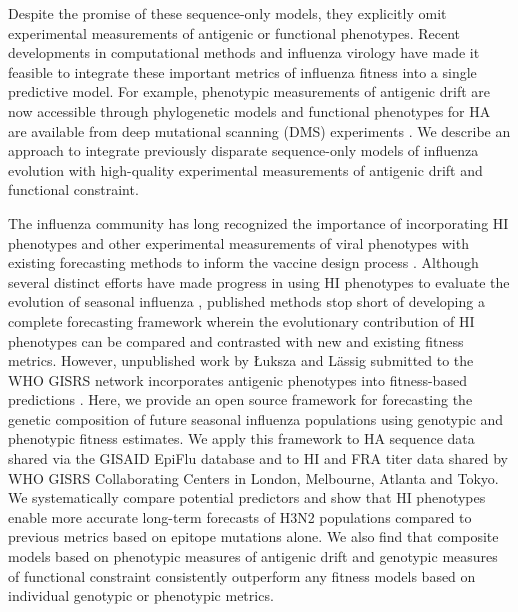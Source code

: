 \documentclass[9pt,lineno]{elife} %
\providecommand{\DIFaddbegin}{} %
\providecommand{\DIFaddend}{} %
\providecommand{\DIFdelbegin}{} %
\providecommand{\DIFdelend}{} %
\providecommand{\DIFaddbegin}{} %
\providecommand{\DIFaddend}{} %
\providecommand{\DIFdelbegin}{} %
\providecommand{\DIFdelend}{} %
\newcommand{\DIFscaledelfig}{0.5}
\newlength{\DIFdelgraphicswidth} %
\newlength{\DIFdelgraphicsheight} %
\newcommand{\DIFaddincludegraphics}[2][]{{\color{blue}\fbox{\DIFOincludegraphics[#1]{#2}}}} %
\newcommand{\DIFdelincludegraphics}[2][]{%
\sbox{\DIFdelgraphicsbox}{\DIFOincludegraphics[#1]{#2}}%
\settoboxwidth{\DIFdelgraphicswidth}{\DIFdelgraphicsbox} %
\settoboxtotalheight{\DIFdelgraphicsheight}{\DIFdelgraphicsbox} %
\scalebox{\DIFscaledelfig}{%
\parbox[b]{\DIFdelgraphicswidth}{\usebox{\DIFdelgraphicsbox}\\[-\baselineskip] \rule{\DIFdelgraphicswidth}{0em}}\llap{\resizebox{\DIFdelgraphicswidth}{\DIFdelgraphicsheight}{%
\setlength{\unitlength}{\DIFdelgraphicswidth}%
\begin{picture}(1,1)%
\thicklines\linethickness{2pt} %
{\color[rgb]{1,0,0}\put(0,0){\framebox(1,1){}}}%
{\color[rgb]{1,0,0}\put(0,0){\line( 1,1){1}}}%
{\color[rgb]{1,0,0}\put(0,1){\line(1,-1){1}}}%
\end{picture}%
}\hspace*{3pt}}} %
} %
\DeclareRobustCommand{\DIFaddbegin}{\DIFOaddbegin \let\includegraphics\DIFaddincludegraphics} %
\DeclareRobustCommand{\DIFaddend}{\DIFOaddend \let\includegraphics\DIFOincludegraphics} %
\DeclareRobustCommand{\DIFdelbegin}{\DIFOdelbegin \let\includegraphics\DIFdelincludegraphics} %
\DeclareRobustCommand{\DIFdelend}{\DIFOaddend \let\includegraphics\DIFOincludegraphics} %
\begin{document}
Despite the promise of these sequence-only models, they explicitly omit experimental measurements of antigenic or functional phenotypes.
Recent developments in computational methods and influenza virology have made it feasible to integrate these important metrics of influenza fitness into a single predictive model.
For example, phenotypic measurements of antigenic drift are now accessible through phylogenetic models \DIFdelbegin %
\DIFdelend \DIFaddbegin \citep{Neher:2016hy} \DIFaddend and functional phenotypes for HA are available from deep mutational scanning (DMS) experiments \DIFdelbegin %
\DIFdelend \DIFaddbegin \citep{Lee2018}\DIFaddend .
We describe an approach to integrate previously disparate sequence-only models of influenza evolution with high-quality experimental measurements of antigenic drift and functional constraint.

The influenza community has long recognized the importance of incorporating HI phenotypes and other experimental measurements of viral phenotypes with existing forecasting methods to inform the vaccine design process \DIFdelbegin %
\DIFdelend \DIFaddbegin \citep{Gandon:2016gz,Morris:2017ea,Lassig:2017hr}\DIFaddend .
Although several distinct efforts have made progress in using HI phenotypes to evaluate the evolution of seasonal influenza \DIFdelbegin %
\DIFdelend \DIFaddbegin \citep{Steinbruck:2014kq,Neher:2016hy}\DIFaddend , published methods stop short of developing a complete forecasting framework wherein the evolutionary contribution of HI phenotypes can be compared and contrasted with new and existing fitness metrics.
However, unpublished work by {\L}uksza and L\"assig submitted to the WHO GISRS network incorporates antigenic phenotypes into fitness-based predictions \DIFdelbegin %
\DIFdelend \DIFaddbegin \citep{Morris:2017ea,luksza_personal_communication}\DIFaddend .
Here, we provide an open source framework for forecasting the genetic composition of future seasonal influenza populations using genotypic and phenotypic fitness estimates.
We apply this framework to HA sequence data shared via the GISAID EpiFlu database \DIFdelbegin %
\DIFdelend \DIFaddbegin \citep{shu2017gisaid} \DIFaddend and to HI and FRA titer data shared by WHO GISRS Collaborating Centers in London, Melbourne, Atlanta and Tokyo.
We systematically compare potential predictors and show that HI phenotypes enable more accurate long-term forecasts of H3N2 populations compared to previous metrics based on epitope mutations alone.
We also find that composite models based on phenotypic measures of antigenic drift and genotypic measures of functional constraint consistently outperform any fitness models based on individual genotypic or phenotypic metrics.
\end{document}
